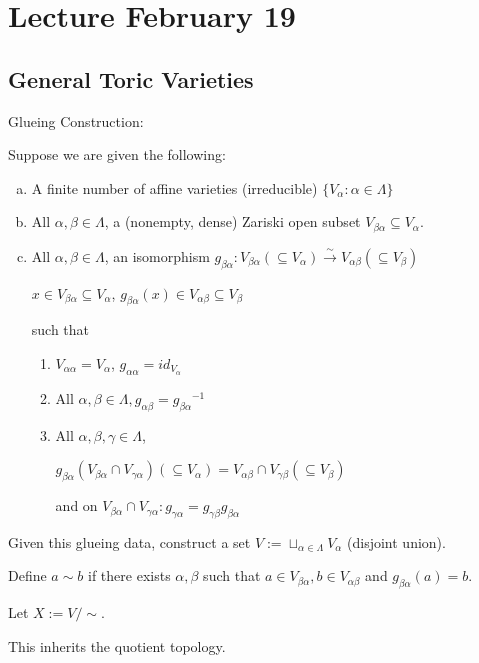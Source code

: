 \documentclass[a4paper,12pt]{amsart}
\newcommand{\iv}{\ensuremath{^{-1}}}
\begin{document}
\newpage
\section{Lecture February 19}

\subsection{General Toric Varieties}
Glueing Construction:
\begin{Def}
	Suppose we are given the following:
	\begin{enumerate}[a)]
		\item A finite number of affine varieties (irreducible) $ \{V_\alpha: \alpha\in \Lambda\} $
		\item All $\alpha, \beta \in \Lambda$, a (nonempty, dense) Zariski open subset $V_{\beta\alpha}\subseteq V_\alpha$.
		\item All $\alpha, \beta \in \Lambda$, an isomorphism $ g_{\beta\alpha}: V_{\beta\alpha}(\subseteq V_\alpha)\xrightarrow{\sim}V_{\alpha\beta}(\subseteq V_\beta) $
		
		$x\in V_{\beta\alpha}\subseteq V_\alpha$, $g_{\beta\alpha}(x)\in V_{\alpha\beta}\subseteq V_\beta$
		
		such that
		\begin{enumerate}[1)]
			\item $V_{\alpha\alpha}=V_\alpha$, $g_{\alpha\alpha}=id_{V_\alpha}$
			\item All $\alpha, \beta \in \Lambda, g_{\alpha\beta}=g_{\beta\alpha}\iv$
			\item All $\alpha, \beta, \gamma \in \Lambda$,
			
			$g_{\beta\alpha}(V_{\beta\alpha}\cap V_{\gamma\alpha})(\subseteq V_\alpha)=V_{\alpha\beta}\cap V_{\gamma\beta}(\subseteq V_\beta)$
			
			and on $V_{\beta\alpha}\cap V_{\gamma\alpha}: g_{\gamma\alpha}=g_{\gamma\beta}g_{\beta\alpha}$
		\end{enumerate}
	\end{enumerate}
\end{Def}
Given this glueing data,
construct a set $V:=\sqcup_{\alpha\in\Lambda} V_\alpha$ (disjoint union).

Define $a\sim b$ if there exists $\alpha, \beta$ such that $a\in V_{\beta\alpha}, b\in V_{\alpha\beta}$ and $g_{\beta\alpha}(a)=b$.

Let $X:=V/\sim$.

This inherits the quotient topology.
\end{document}
